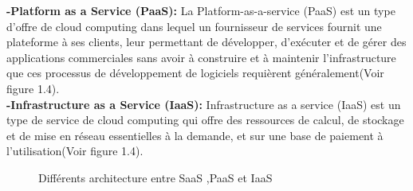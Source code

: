 \noindent \textbf{\Large -Platform as a Service (PaaS): } La Platform-as-a-service (PaaS) est un type d'offre de cloud computing dans lequel un fournisseur de services fournit une plateforme à ses clients, leur permettant de développer, d'exécuter et de gérer des applications commerciales sans avoir à construire et à maintenir l'infrastructure que ces processus de développement de logiciels requièrent généralement(Voir figure 1.4)\cite{4}.\\[0.1cm]
%
%
\noindent \textbf{\Large -Infrastructure as a Service (IaaS): }Infrastructure as a service (IaaS) est un type de service de cloud computing qui offre des ressources de calcul, de stockage et de mise en réseau essentielles à la demande, et sur une base de paiement à l’utilisation(Voir figure 1.4)\cite{5}.\\[0.1cm]
\begin{figure}[H]
    \begin{center}

    \end{center}

    \caption{ Différents architecture entre SaaS ,PaaS et IaaS}
\end{figure}
